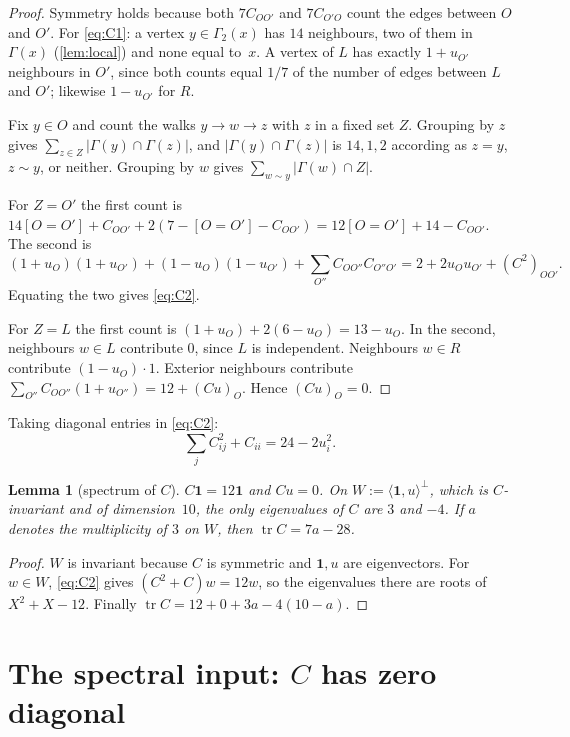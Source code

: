 \documentclass[11pt,a4paper]{amsart}
\newtheorem{lemma}[theorem]{Lemma}
\theoremstyle{definition}
\theoremstyle{remark}
\newcommand{\one}{\mathbf{1}}
\newcommand{\tr}{\operatorname{tr}}
\begin{document}
\begin{proof}
Symmetry holds because both $7C_{OO'}$ and $7C_{O'O}$ count the edges between $O$ and $O'$. For
\eqref{eq:C1}: a vertex $y\in\Gamma_2(x)$ has $14$ neighbours, two of them in $\Gamma(x)$
(\cref{lem:local}) and none equal to~$x$. A vertex of $L$ has exactly $1+u_{O'}$ neighbours in $O'$,
since both counts equal $1/7$ of the number of edges between $L$ and $O'$; likewise $1-u_{O'}$ for $R$.

Fix $y\in O$ and count the walks $y\to w\to z$ with $z$ in a fixed set $Z$. Grouping by $z$ gives
$\sum_{z\in Z}|\Gamma(y)\cap\Gamma(z)|$, and $|\Gamma(y)\cap\Gamma(z)|$ is $14,1,2$ according as
$z=y$, $z\sim y$, or neither. Grouping by $w$ gives $\sum_{w\sim y}|\Gamma(w)\cap Z|$.

For $Z=O'$ the first count is $14[O{=}O']+C_{OO'}+2(7-[O{=}O']-C_{OO'})=12[O{=}O']+14-C_{OO'}$. The
second is
\[
(1+u_O)(1+u_{O'})+(1-u_O)(1-u_{O'})+\sum_{O''}C_{OO''}C_{O''O'}=2+2u_Ou_{O'}+(C^2)_{OO'}.
\]
Equating the two gives \eqref{eq:C2}.

For $Z=L$ the first count is $(1+u_O)+2(6-u_O)=13-u_O$. In the second, neighbours $w\in L$ contribute
$0$, since $L$ is independent. Neighbours $w\in R$ contribute $(1-u_O)\cdot1$. Exterior neighbours
contribute $\sum_{O''}C_{OO''}(1+u_{O''})=12+(Cu)_O$. Hence $(Cu)_O=0$.
\end{proof}

Taking diagonal entries in \eqref{eq:C2}:
\begin{equation}\label{eq:diag}
\sum_j C_{ij}^2+C_{ii}=24-2u_i^2 .
\end{equation}

\begin{lemma}[spectrum of $C$]\label{lem:specC}
$C\one=12\one$ and $Cu=0$. On $W:=\langle\one,u\rangle^{\perp}$, which is $C$-invariant and of
dimension~$10$, the only eigenvalues of $C$ are $3$ and $-4$. If $a$ denotes the multiplicity of $3$ on
$W$, then $\tr C=7a-28$.
\end{lemma}

\begin{proof}
$W$ is invariant because $C$ is symmetric and $\one,u$ are eigenvectors. For $w\in W$, \eqref{eq:C2} gives
$(C^2+C)w=12w$, so the eigenvalues there are roots of $X^2+X-12$. Finally
$\tr C=12+0+3a-4(10-a)$.
\end{proof}

\section{The spectral input: $C$ has zero diagonal}\label{sec:spectral}
\end{document}

